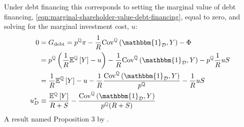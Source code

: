 \documentclass[../main.tex]{subfiles}
\begin{document}
            Under debt financing this corresponds to setting the marginal value of debt financing,
            \cref{eqn:marginal-shareholder-value-debt-financing}, equal to zero,
            and solving for the marginal investment cost, $u$:
                \begin{align}
                    0 &= G_{\text{debt}} 
                    = 
                        p^{\mathbb{Q}}\pi 
                        - 
                        \discountfactor  
                        \text{Cov}^{\mathbb{Q}}\left(\mathbbm{1}_{\mathcal{D}}, Y\right) 
                        - 
                        \Phi
                        \nonumber\\
                    &=
                        p^{\mathbb{Q}} \left(
                            \discountfactor
                            \mathbb{E}^{\mathbb{Q}}\left[Y\right]
                            - u
                        \right)
                        -
                        \discountfactor
                        \text{Cov}^{\mathbb{Q}}\left(\mathbbm{1}_{\mathcal{D}}, Y\right) 
                        - 
                        p^{\mathbb{Q}} \discountfactor u S 
                        \nonumber\\
                    &= 
                        \discountfactor
                        \mathbb{E}^{\mathbb{Q}}\left[Y\right]  
                        - u
                        - 
                        \discountfactor
                        \frac{
                            \text{Cov}^{\mathbb{Q}}\left(\mathbbm{1}_{\mathcal{D}}, Y\right) 
                        }{
                            p^{\mathbb{Q}}
                        }
                        - \discountfactor u S 
                        \nonumber\\
                    u^{\ast}_{D}
                    &\equiv
                        \frac{
                            \mathbb{E}^{\mathbb{Q}}\left[Y\right]
                        }{
                            \grossrfrate + S  
                        } 
                        - \frac{
                            \text{Cov}^{\mathbb{Q}}\left(\mathbbm{1}_{\mathcal{D}}, Y\right)
                        }{
                            p^{\mathbb{Q}}(\grossrfrate + S)  
                        } 
                \end{align}
            A result named Proposition 3 by \cite{ADS2019}.
\end{document}
